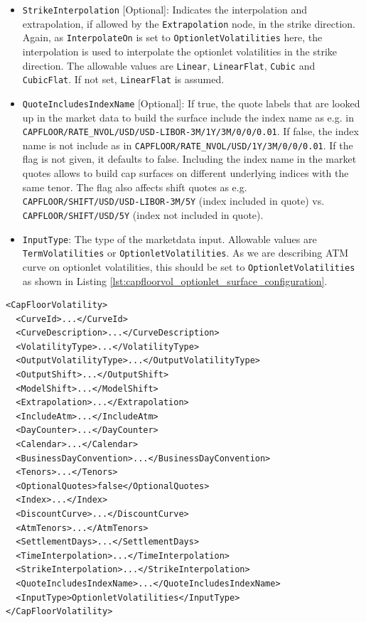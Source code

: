 \begin{itemize}
\item \lstinline!StrikeInterpolation! [Optional]:
Indicates the interpolation and extrapolation, if allowed by the \lstinline!Extrapolation! node, in the strike direction. Again, as \lstinline!InterpolateOn! is set to \lstinline!OptionletVolatilities! here, the interpolation is used to interpolate the optionlet volatilities in the strike direction. The allowable values are \lstinline!Linear!, \lstinline!LinearFlat!, \lstinline!Cubic! and \lstinline!CubicFlat!. If not set, \lstinline!LinearFlat! is assumed.

\item \lstinline!QuoteIncludesIndexName! [Optional]:
If true, the quote labels that are looked up in the market data to build the surface include the index name as e.g. in \lstinline!CAPFLOOR/RATE_NVOL/USD/USD-LIBOR-3M/1Y/3M/0/0/0.01!. If false, the index name is not include as in \lstinline!CAPFLOOR/RATE_NVOL/USD/1Y/3M/0/0/0.01!. If the flag is not given, it defaults to false. Including the index name in the market quotes allows to build cap surfaces on different underlying indices with the same tenor. The flag also affects shift quotes as e.g. \lstinline!CAPFLOOR/SHIFT/USD/USD-LIBOR-3M/5Y! (index included in quote) vs. \lstinline!CAPFLOOR/SHIFT/USD/5Y! (index not included in quote).

\item \lstinline!InputType!:
The type of the marketdata input. Allowable values are \lstinline!TermVolatilities! or \lstinline!OptionletVolatilities!. As we are describing ATM curve on optionlet volatilities, this should be set to \lstinline!OptionletVolatilities! as shown in Listing \ref{lst:capfloorvol_optionlet_surface_configuration}.

\end{itemize}

\begin{longlisting}
\begin{verbatim}
<CapFloorVolatility>
  <CurveId>...</CurveId>
  <CurveDescription>...</CurveDescription>
  <VolatilityType>...</VolatilityType>
  <OutputVolatilityType>...</OutputVolatilityType>
  <OutputShift>...</OutputShift>
  <ModelShift>...</ModelShift>
  <Extrapolation>...</Extrapolation>
  <IncludeAtm>...</IncludeAtm>
  <DayCounter>...</DayCounter>
  <Calendar>...</Calendar>
  <BusinessDayConvention>...</BusinessDayConvention>
  <Tenors>...</Tenors>
  <OptionalQuotes>false</OptionalQuotes>
  <Index>...</Index>
  <DiscountCurve>...</DiscountCurve>
  <AtmTenors>...</AtmTenors>
  <SettlementDays>...</SettlementDays>
  <TimeInterpolation>...</TimeInterpolation>
  <StrikeInterpolation>...</StrikeInterpolation>
  <QuoteIncludesIndexName>...</QuoteIncludesIndexName>
  <InputType>OptionletVolatilities</InputType>
</CapFloorVolatility>
\end{verbatim}
\caption{Cap floor surface with optionlet volatilities input.}
\label{lst:capfloorvol_optionlet_surface_configuration}
\end{longlisting}

